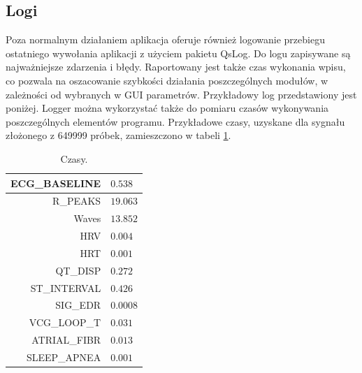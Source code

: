 \subsection{Logi}

Poza normalnym działaniem aplikacja oferuje również logowanie przebiegu ostatniego wywołania aplikacji z użyciem pakietu QsLog. Do logu zapisywane są najważniejsze zdarzenia i błędy. Raportowany jest także czas wykonania wpisu, co pozwala na oszacowanie szybkości działania poszczególnych modułów, w zależności od wybranych w GUI parametrów. Przykładowy log przedstawiony jest poniżej. Logger można wykorzystać także do pomiaru czasów wykonywania poszczególnych elementów programu. Przykładowe czasy, uzyskane dla sygnału złożonego z 649999 próbek, zamieszczono w tabeli \ref{tab:czasy}.

\begin{table}
\centering
\begin{tabular}{|r|l|}

\hline
ECG\_BASELINE & $0.538$\\
\hline
R\_PEAKS & $19.063$	\\
\hline
Waves & $13.852$		\\
\hline
HRV & $0.004$		\\
\hline
HRT & $0.001$		\\
\hline
QT\_DISP &$ 0.272 $	 \\
\hline
ST\_INTERVAL &$ 0.426$	\\
\hline
SIG\_EDR & $0.0008$	\\
\hline
VCG\_LOOP\_T & $0.031$	\\
\hline
ATRIAL\_FIBR & $0.013$	\\
\hline
SLEEP\_APNEA & $0.001$	 \\
\hline

\end{tabular}
\caption {Czasy.}
\label{tab:czasy}
\end{table}

